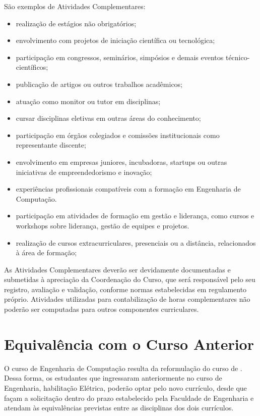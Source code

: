 São exemplos de Atividades Complementares:
\begin{itemize}
    \item realização de estágios não obrigatórios;
    \item envolvimento com projetos de iniciação científica ou tecnológica;
    \item participação em congressos, seminários, simpósios e demais eventos técnico-científicos;
    \item publicação de artigos ou outros trabalhos acadêmicos;
    \item atuação como monitor ou tutor em disciplinas;
    \item cursar disciplinas eletivas em outras áreas do conhecimento;
    \item participação em órgãos colegiados e comissões institucionais como representante discente;
    \item envolvimento em empresas juniores, incubadoras, startups ou outras iniciativas de empreendedorismo e inovação;
    \item experiências profissionais compatíveis com a formação em Engenharia de Computação.
    \item participação em atividades de formação em gestão e liderança, como cursos e workshops sobre liderança, gestão de equipes e projetos.
    \item realização de cursos extracurriculares, presenciais ou a distância, relacionados à área de formação;
\end{itemize}

As Atividades Complementares deverão ser devidamente documentadas e submetidas à apreciação da Coordenação do Curso, que será responsável pelo seu registro, avaliação e validação, conforme normas estabelecidas em regulamento próprio. Atividades utilizadas para contabilização de horas complementares não poderão ser computadas para outros componentes curriculares.


\section{Equivalência com o Curso Anterior}

O curso de Engenharia de Computação resulta da reformulação do curso de \cursoatual. Dessa forma, os estudantes que ingressaram anteriormente no curso de Engenharia, habilitação Elétrica, poderão optar pelo novo currículo, desde que façam a solicitação dentro do prazo estabelecido pela Faculdade de Engenharia e atendam às equivalências previstas entre as disciplinas dos dois currículos.

